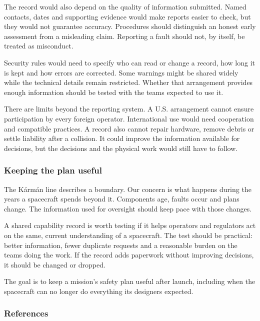 \documentclass[11pt,letterpaper]{article}
\begin{document}
The record would also depend on the quality of information submitted.
Named contacts, dates and supporting evidence would make reports easier
to check, but they would not guarantee accuracy. Procedures should
distinguish an honest early assessment from a misleading claim.
Reporting a fault should not, by itself, be treated as misconduct.

Security rules would need to specify who can read or change a record,
how long it is kept and how errors are corrected. Some warnings might be
shared widely while the technical details remain restricted. Whether
that arrangement provides enough information should be tested with the
teams expected to use it.

There are limits beyond the reporting system. A U.S. arrangement cannot
ensure participation by every foreign operator. International use would
need cooperation and compatible practices. A record also cannot repair
hardware, remove debris or settle liability after a collision. It could
improve the information available for decisions, but the decisions and
the physical work would still have to follow.

\hypertarget{keeping-the-plan-useful}{%
\subsubsection{Keeping the plan useful}\label{keeping-the-plan-useful}}

The Kármán line describes a boundary. Our concern is what happens during
the years a spacecraft spends beyond it. Components age, faults occur
and plans change. The information used for oversight should keep pace
with those changes.

A shared capability record is worth testing if it helps operators and
regulators act on the same, current understanding of a spacecraft. The
test should be practical: better information, fewer duplicate requests
and a reasonable burden on the teams doing the work. If the record adds
paperwork without improving decisions, it should be changed or dropped.

The goal is to keep a mission's safety plan useful after launch,
including when the spacecraft can no longer do everything its designers
expected.

\hypertarget{references}{%
\subsubsection{References}\label{references}}
\end{document}
